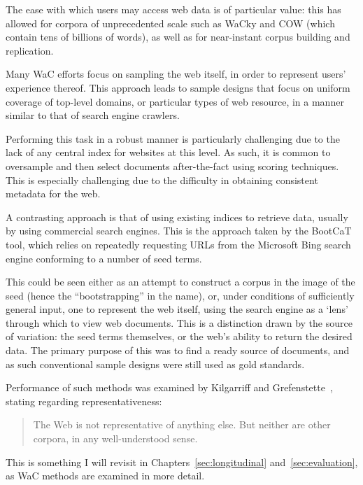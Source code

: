 The ease with which users may access web data is of particular value: this has allowed for corpora of unprecedented scale such as WaCky\cite{baroni2009wacky} and COW\cite{schafer2012building} (which contain tens of billions of words), as well as for near-instant corpus building and replication.

Many WaC efforts focus on sampling the web itself, in order to represent users' experience thereof.  This approach leads to sample designs that focus on uniform coverage of top-level domains, or particular types of web resource, in a manner similar to that of search engine crawlers.

Performing this task in a robust manner is particularly challenging due to the lack of any central index for websites at this level.  As such, it is common to oversample and then select documents after-the-fact using scoring techniques\cite{schafer2013web,schafer2014focused}.  This is especially challenging due to the difficulty in obtaining consistent metadata for the web.

A contrasting approach is that of using existing indices to retrieve data, usually by using commercial search engines.  This is the approach taken by the BootCaT tool, which relies on repeatedly requesting URLs from the Microsoft Bing search engine conforming to a number of seed terms.

This could be seen either as an attempt to construct a corpus in the image of the seed (hence the ``bootstrapping'' in the name), or, under conditions of sufficiently general input, one to represent the web itself, using the search engine as a `lens' through which to view web documents.  This is a distinction drawn by the source of variation: the seed terms themselves, or the web's ability to return the desired data.  The primary purpose of this was to find a ready source of documents, and as such conventional sample designs were still used as gold standards.

Performance of such methods was examined by Kilgarriff and Grefenstette~\cite[p. 343]{kilgarriff2003introduction}, stating regarding representativeness:

\begin{quote}
The Web is not representative of anything else. But neither are other corpora, in any
well-understood sense.
\end{quote}

This is something I will revisit in Chapters~\ref{sec:longitudinal} and~\ref{sec:evaluation}, as WaC methods are examined in more detail.


